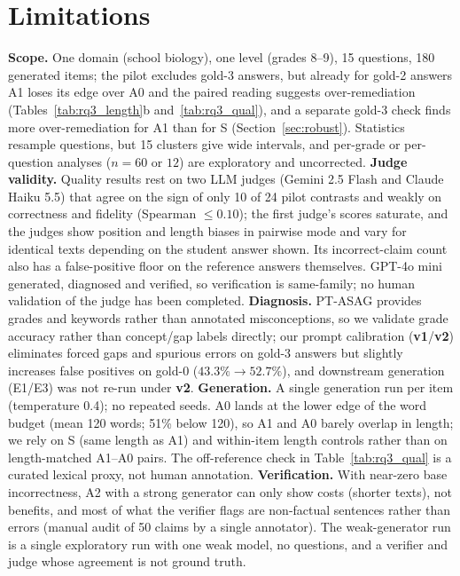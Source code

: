 \documentclass[11pt]{article}
\begin{document}
\section*{Limitations}
\textbf{Scope.} One domain (school biology), one level (grades 8--9), 15 questions, 180 generated items; the pilot excludes gold-3 answers, but already for gold-2 answers A1 loses its edge over A0 and the paired reading suggests over-remediation (Tables~\ref{tab:rq3_length}b and~\ref{tab:rq3_qual}), and a separate gold-3 check finds more over-remediation for A1 than for S (Section~\ref{sec:robust}). Statistics resample questions, but 15 clusters give wide intervals, and per-grade or per-question analyses ($n{=}60$ or $12$) are exploratory and uncorrected.
\textbf{Judge validity.} Quality results rest on two LLM judges (Gemini 2.5 Flash and Claude Haiku 5.5) that agree on the sign of only 10 of 24 pilot contrasts and weakly on correctness and fidelity (Spearman $\le 0.10$); the first judge's scores saturate, and the judges show position and length biases in pairwise mode and vary for identical texts depending on the student answer shown. Its incorrect-claim count also has a false-positive floor on the reference answers themselves. GPT-4o mini generated, diagnosed and verified, so verification is same-family; no human validation of the judge has been completed.
\textbf{Diagnosis.} PT-ASAG provides grades and keywords rather than annotated misconceptions, so we validate grade accuracy rather than concept/gap labels directly; our prompt calibration (\textbf{v1}/\textbf{v2}) eliminates forced gaps and spurious errors on gold-$3$ answers but slightly increases false positives on gold-$0$ ($43.3\% \to 52.7\%$), and downstream generation (E1/E3) was not re-run under \textbf{v2}.
\textbf{Generation.} A single generation run per item (temperature 0.4); no repeated seeds. A0 lands at the lower edge of the word budget (mean 120 words; 51\% below 120), so A1 and A0 barely overlap in length; we rely on S (same length as A1) and within-item length controls rather than on length-matched A1--A0 pairs. The off-reference check in Table~\ref{tab:rq3_qual} is a curated lexical proxy, not human annotation.
\textbf{Verification.} With near-zero base incorrectness, A2 with a strong generator can only show costs (shorter texts), not benefits, and most of what the verifier flags are non-factual sentences rather than errors (manual audit of 50 claims by a single annotator). The weak-generator run is a single exploratory run with one weak model, no questions, and a verifier and judge whose agreement is not ground truth.
\end{document}
